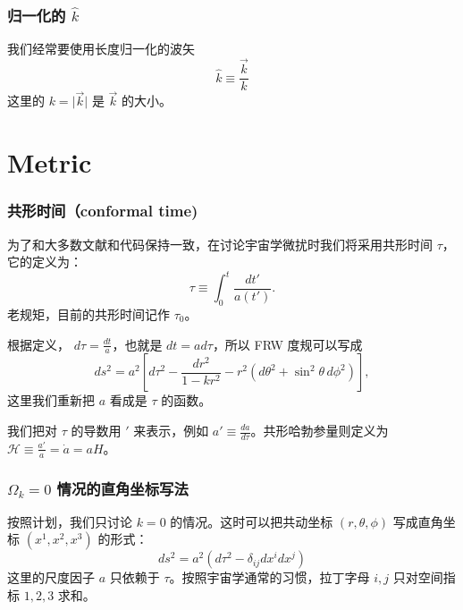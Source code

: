 \documentclass[CJK,13pt]{beamer}
\begin{document}
  \begin{frame}
    \frametitle{归一化的 $\hat{k}$}
    我们经常要使用长度归一化的波矢
    {\blue $$\hat{k}\equiv \frac{\vec{k}}{k}$$}
    这里的 $k = \lvert\vec{k}\rvert$ 是 $\vec{k}$ 的大小。

    \skiplines
    
  \end{frame}

  
  \section{Metric}
  
  \begin{frame}
      \frametitle{共形时间（conformal time) }
        为了和大多数文献和代码保持一致，在讨论宇宙学微扰时我们将采用共形时间 $\tau$，它的定义为：
        $$ \tau \equiv \int_0^t \frac{dt'}{a(t')}.$$
        老规矩，目前的共形时间记作 $\tau_0$。


        \skipline

        根据定义， $d\tau = \frac{dt}{a}$，也就是 $dt = a d\tau$，所以 FRW 度规可以写成
        $$ ds^2 = a^2\left[d\tau^2 - \frac{dr^2}{1-kr^2} - r^2\left(d\theta^2+\sin^2\theta\,d\phi^2\right)\right],$$
        这里我们重新把 $a$ 看成是 $\tau$ 的函数。

        \skipline

        {\blue 我们把对 $\tau$ 的导数用 $'$ 来表示，例如 $a' \equiv \frac{da}{d\tau}$。共形哈勃参量则定义为
        $\mathcal{H} \equiv \frac{a'}{a} = \dot a = aH$。}
  \end{frame}



    \begin{frame}
      \frametitle{$\Omega_k=0$ 情况的直角坐标写法}
      按照计划，我们只讨论 $k=0$ 的情况。这时可以把共动坐标 $(r,\theta,\phi)$ 写成直角坐标 $ (x^1, x^2, x^3)$ 的形式：
      $$ ds^2 = a^2\left(d\tau^2-\delta_{ij}dx^i dx^j\right)$$
      这里的尺度因子 $a$ 只依赖于 $\tau$。按照宇宙学通常的习惯，拉丁字母 $i, j$ 只对空间指标 $1,2,3$ 求和。
  \end{frame}
\end{document}
